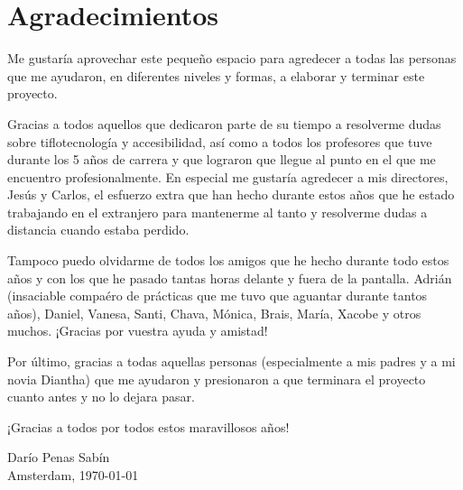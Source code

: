 %
%

\section*{Agradecimientos}

Me gustaría aprovechar este pequeño espacio para agredecer a todas las personas que me ayudaron, en diferentes niveles y formas, a elaborar y terminar este proyecto.

Gracias a todos aquellos que dedicaron parte de su tiempo a resolverme dudas sobre tiflotecnología y accesibilidad, así como a todos los profesores que tuve durante los 5 años de carrera y que lograron que llegue al punto en el que me encuentro profesionalmente. En especial me gustaría agredecer a mis directores, Jesús y Carlos, el esfuerzo extra que han hecho durante estos años que he estado trabajando en el extranjero para mantenerme al tanto y resolverme dudas a distancia cuando estaba perdido.

Tampoco puedo olvidarme de todos los amigos que he hecho durante todo estos años y con los que he pasado tantas horas delante y fuera de la pantalla. Adrián (insaciable compaéro de prácticas que me tuvo que aguantar durante tantos años), Daniel, Vanesa, Santi, Chava, Mónica, Brais, María, Xacobe y otros muchos. ¡Gracias por vuestra ayuda y amistad!

Por último, gracias a todas aquellas personas (especialmente a mis padres y a mi novia Diantha) que me ayudaron y presionaron a que terminara el proyecto cuanto antes y no lo dejara pasar.

¡Gracias a todos por todos estos maravillosos años!

\begin{flushright}
  Darío Penas Sabín \\
  Amsterdam, \today
\end{flushright}

